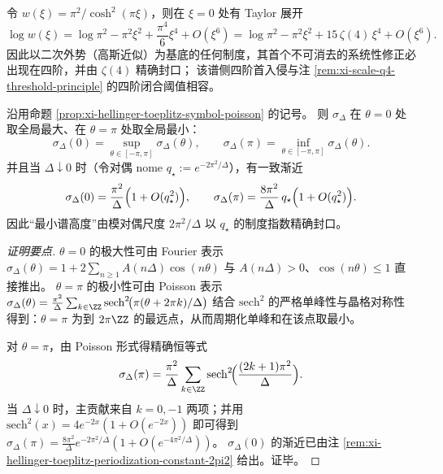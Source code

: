 \begin{remark}\label{rem:xi-hellinger-logw-zeta4-entry}
令 \(w(\xi)=\pi^2/\cosh^2(\pi\xi)\)，则在 \(\xi=0\) 处有 Taylor 展开
\[
\log w(\xi)=\log\pi^2-\pi^2\xi^2+\frac{\pi^4}{6}\xi^4+O(\xi^6)
=\log\pi^2-\pi^2\xi^2+15\,\zeta(4)\,\xi^4+O(\xi^6).
\]
因此以二次外势（高斯近似）为基底的任何制度，其首个不可消去的系统性修正必出现在四阶，并由 \(\zeta(4)\) 精确封口；
该谱侧四阶首入侵与注 \ref{rem:xi-scale-q4-threshold-principle} 的四阶闭合阈值相容。
\end{remark}

\begin{proposition}\label{prop:xi-hellinger-toeplitz-symbol-extrema-qstar}
沿用命题 \ref{prop:xi-hellinger-toeplitz-symbol-poisson} 的记号。
则 \(\sigma_\Delta\) 在 \(\theta=0\) 处取全局最大、在 \(\theta=\pi\) 处取全局最小：
\[
\sigma_\Delta(0)=\sup_{\theta\in[-\pi,\pi]}\sigma_\Delta(\theta),
\qquad
\sigma_\Delta(\pi)=\inf_{\theta\in[-\pi,\pi]}\sigma_\Delta(\theta).
\]
并且当 \(\Delta\downarrow 0\) 时（令对偶 nome \(q_\star:=e^{-2\pi^2/\Delta}\)），有一致渐近
\[
\sigma_\Delta(0)=\frac{\pi^2}{\Delta}\Bigl(1+O(q_\star^{2})\Bigr),
\qquad
\sigma_\Delta(\pi)=\frac{8\pi^2}{\Delta}\,q_\star\Bigl(1+O(q_\star^{2})\Bigr).
\]
因此“最小谱高度”由模对偶尺度 \(2\pi^2/\Delta\) 以 \(q_\star\) 的制度指数精确封口。
\end{proposition}
\begin{proof}[证明要点]
\(\theta=0\) 的极大性可由 Fourier 表示
\(
\sigma_\Delta(\theta)=1+2\sum_{n\ge 1}A(n\Delta)\cos(n\theta)
\)
与 \(A(n\Delta)>0\)、\(\cos(n\theta)\le 1\) 直接推出。
\(\theta=\pi\) 的极小性可由 Poisson 表示
\(
\sigma_\Delta(\theta)=\frac{\pi^2}{\Delta}\sum_{k\in\ZZ}\mathrm{sech}^2\!\bigl(\pi(\theta+2\pi k)/\Delta\bigr)
\)
结合 \(\mathrm{sech}^2\) 的严格单峰性与晶格对称性得到：\(\theta=\pi\) 为到 \(2\pi\ZZ\) 的最远点，从而周期化单峰和在该点取最小。
\par
对 \(\theta=\pi\)，由 Poisson 形式得精确恒等式
\[
\sigma_\Delta(\pi)=\frac{\pi^2}{\Delta}\sum_{k\in\ZZ}\mathrm{sech}^2\!\Bigl(\frac{(2k+1)\pi^2}{\Delta}\Bigr).
\]
当 \(\Delta\downarrow 0\) 时，主贡献来自 \(k=0,-1\) 两项；并用
\(
\mathrm{sech}^2(x)=4e^{-2x}(1+O(e^{-2x}))
\)
即可得到
\(
\sigma_\Delta(\pi)=\frac{8\pi^2}{\Delta}e^{-2\pi^2/\Delta}(1+O(e^{-4\pi^2/\Delta}))
\)。
\(\sigma_\Delta(0)\) 的渐近已由注 \ref{rem:xi-hellinger-toeplitz-periodization-constant-2pi2} 给出。证毕。
\end{proof}

